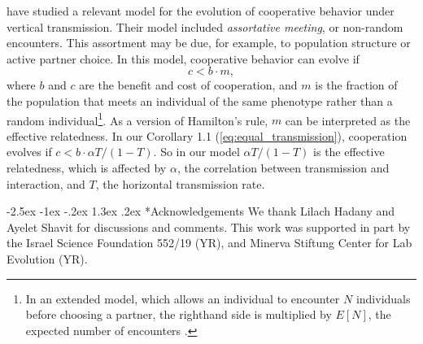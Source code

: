 \documentclass[12pt]{extarticle}
\makeatletter
\renewcommand\section{\@startsection {section}{1}{\z@}%
     {-2.5ex \@plus -1ex \@minus -.2ex}%
     {1.3ex \@plus.2ex}%
    {\Large\bfseries}}
\makeatother
\begin{document}
\citet{Eshel1982} have studied a relevant model for the evolution of cooperative behavior under vertical transmission. Their model included \emph{assortative meeting}, or non-random encounters. This assortment may be due, for example, to population structure or active partner choice.
In this model, cooperative behavior can evolve if \citep[eq.~3.2]{Eshel1982}
\begin{equation} \label{eq:assortative_meeting}
c < b \cdot m,
\end{equation}
where $b$ and $c$ are the benefit and cost of cooperation, and $m$ is the fraction of the population that meets an individual of the same phenotype rather than a random individual\footnote{In an extended model, which allows an individual to encounter $N$ individuals before choosing a partner, the righthand side is multiplied by $E[N]$, the expected number of encounters \citep[eq.~4.6]{Eshel1982}.
}. 
As a version of Hamilton's rule, $m$ can be interpreted as the effective relatedness.
In our Corollary 1.1 (\autoref{eq:equal_transmission}), cooperation evolves if $c < b \cdot \alpha T / (1-T)$. So in our model $\alpha T/(1-T)$ is the effective relatedness, which is affected by $\alpha$, the correlation between transmission and interaction, and $T$, the horizontal transmission rate.




\pagebreak
{\small
\section*{Acknowledgements}
We thank Lilach Hadany and Ayelet Shavit for discussions and comments.
This work was supported in part by
the Israel Science Foundation 552/19 (YR),
and Minerva Stiftung Center for Lab Evolution (YR).
}



\end{document}
